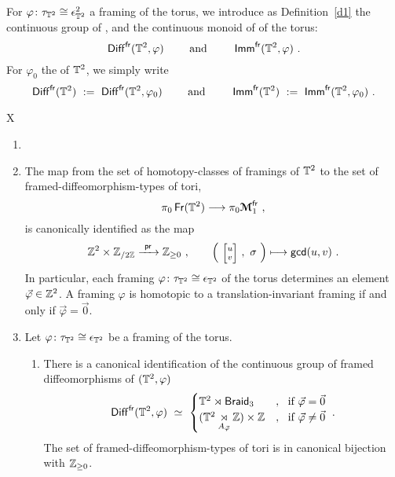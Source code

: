 For $\varphi \colon  \tau_{\mathbb T^2} \cong \epsilon^2_{\mathbb T^2}$ a framing of the torus, we introduce as Definition~\ref{d1} the continuous group of , and the continuous monoid of  of the torus:
\[
\operatorname{{\sf Diff}}^{\operatorname{\sf fr}}(\mathbb T^2,\varphi)
\qquad
\text{ and }
\qquad
\operatorname{\sf Imm}^{\operatorname{\sf fr}}(\mathbb T^2,\varphi)
~.
\]
For $\varphi_0$ the  of $\mathbb T^2$, we simply write 
\[
\operatorname{{\sf Diff}}^{\operatorname{\sf fr}}(\mathbb T^2)
~:=~
\operatorname{{\sf Diff}}^{\operatorname{\sf fr}}(\mathbb T^2,\varphi_0)
\qquad
\text{ and }
\qquad
\operatorname{\sf Imm}^{\operatorname{\sf fr}}(\mathbb T^2)
~:=~
\operatorname{\sf Imm}^{\operatorname{\sf fr}}(\mathbb T^2,\varphi_0)
~.
\]






\begin{mythm}{X}
\label{Theorem A}


\begin{enumerate}

\item[~]

\item
The map from the set of homotopy-classes of framings of $\mathbb T^2$ to the set of framed-diffeomorphism-types of tori,
\[
\pi_0 \operatorname{\sf Fr}(\mathbb T^2)
\longrightarrow
\pi_0 \boldsymbol{\mathcal M}^{\operatorname{\sf fr}}_1
~,
\]
is canonically identified as the map
\[
\ZZ^2 
\times
\ZZ_{/2\ZZ}
\xra{~\pr~}
\ZZ_{\geq 0}
~,\qquad
\left(
~
\mbox{\scriptsize$\begin{bmatrix}
u \\ v
\end{bmatrix}$}
~,~
\sigma
~
\right)
\longmapsto
{\sf gcd}(u,v)
~.
\]
In particular, each framing $\varphi\colon \tau_{\mathbb T^2} \cong \epsilon_{\mathbb T^2}$ of the torus determines an element $\vec{\varphi} \in \mathbb Z^2$.
A framing $\varphi$ is homotopic to a translation-invariant framing if and only if $\vec{\varphi} = \vec{0}$.




\item
Let $\varphi\colon \tau_{\mathbb T^2} \cong \epsilon_{\mathbb T^2} $ be a framing of the torus.

\begin{enumerate}

\item
There is a canonical identification of the continuous group of framed diffeomorphisms of $(\mathbb T^2,\varphi)$
\[
\operatorname{{\sf Diff}}^{\operatorname{\sf fr}}(\mathbb T^2,\varphi)
~\simeq~
\begin{cases}
\mathbb T^2 \rtimes \operatorname{{\sf Braid}_3}
&
,~
\text{ if } \vec{\varphi} = \vec{0}
\\
( \mathbb T^2 \underset{A_{\vec{\varphi}}}\rtimes \mathbb Z ) \times \mathbb Z
&
,~
\text{ if } \vec{\varphi} \neq \vec{0}
\end{cases}
~.
\]
The set of framed-diffeomorphism-types of tori is in canonical bijection with $\mathbb Z_{\geq 0}$.









\end{enumerate}
\end{enumerate}
\end{mythm}

